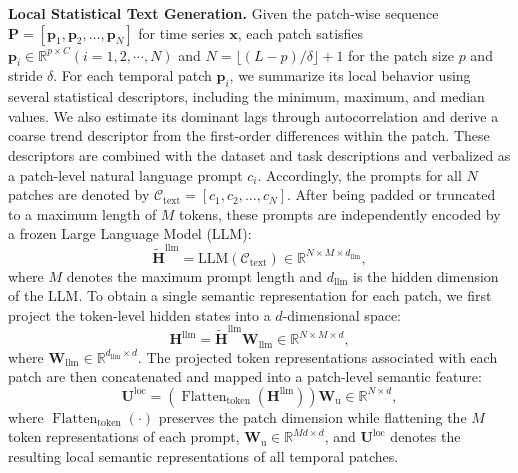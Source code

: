 \documentclass[letterpaper]{article} %
\begin{document}
\noindent\textbf{Local Statistical Text Generation.}
Given the patch-wise sequence
$\mathbf{P}=[\mathbf{p}_1,\mathbf{p}_2,\ldots,\mathbf{p}_N]$ for time series $\mathbf{x}$, each patch satisfies $\mathbf{p}_i\in\mathbb{R}^{p \times C}(i=1,2,\cdots, N)$ and $N=\lfloor(L-p)/\delta\rfloor+1$ for the patch size $p$ and stride $\delta$. 
For each temporal patch $\mathbf{p}_i$, we summarize its local behavior using several statistical descriptors, including the minimum, maximum, and median values. We also estimate its dominant lags through autocorrelation and derive a coarse trend descriptor from the first-order differences within the patch. These descriptors are combined with the dataset and task descriptions and verbalized as a patch-level natural language prompt $c_i$. Accordingly, the prompts for all $N$ patches are denoted by $\mathcal{C}_{\mathrm{text}}=[c_1,c_2,\ldots,c_N]$. After being padded or truncated to a maximum length of $M$ tokens, these prompts are independently encoded by a frozen Large Language Model (LLM):
\begin{equation}
    \widetilde{\mathbf{H}}^{\mathrm{llm}}
    =\mathrm{LLM}(\mathcal{C}_{\mathrm{text}})
    \in
    \mathbb{R}^{N\times M\times d_{\mathrm{llm}}},
\end{equation}
where $M$ denotes the maximum prompt length and $d_{\mathrm{llm}}$ is the
hidden dimension of the LLM. To obtain a single semantic representation for
each patch, we first project the token-level hidden states into a
$d$-dimensional space:
\begin{equation}
    \mathbf{H}^{\mathrm{llm}}
    =
    \widetilde{\mathbf{H}}^{\mathrm{llm}}\mathbf{W}_{\mathrm{llm}}
    \in \mathbb{R}^{N\times M\times d},
\end{equation}
where
$\mathbf{W}_{\mathrm{llm}}\in
\mathbb{R}^{d_{\mathrm{llm}}\times d}$.
The projected token representations associated with each patch are then
concatenated and mapped into a patch-level semantic feature:
\begin{equation}
    \mathbf{U}^{\mathrm{loc}}
    =
    \left(
    \operatorname{Flatten}_{\mathrm{token}}
    \left(
        \mathbf{H}^{\mathrm{llm}}
    \right)
    \right)
    \mathbf{W}_{\mathrm{u}}
    \in\mathbb{R}^{N\times d},
\end{equation}
where $\operatorname{Flatten}_{\mathrm{token}}(\cdot)$ preserves the patch
dimension while flattening the $M$ token representations of each prompt,  $\mathbf{W}_{\mathrm{u}}\in\mathbb{R}^{Md\times d}$, and
$\mathbf{U}^{\mathrm{loc}}$ denotes the resulting local semantic
representations of all temporal patches.
\end{document}
